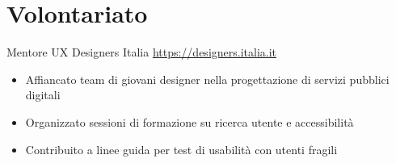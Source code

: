 \documentclass[a4paper, serif, 10pt]{moderncv}
\begin{document}
\section{Volontariato}

        {Mentore UX}
        {Designers Italia}
        {\url{https://designers.italia.it}}
        {}
        {\begin{itemize}
\item Affiancato team di giovani designer nella progettazione di servizi pubblici digitali
\item Organizzato sessioni di formazione su ricerca utente e accessibilità
\item Contribuito a linee guida per test di usabilità con utenti fragili
\end{itemize}}
    
\end{document}
